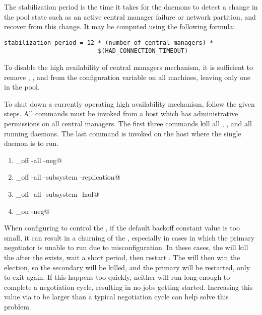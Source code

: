 The stabilization period is the time it takes for the
 daemons
to detect a change in the pool state such as
an active central manager failure
or network partition, and recover from this change.
It may be computed using the following formula:
\footnotesize
\begin{verbatim}
stabilization period = 12 * (number of central managers) *
                          $(HAD_CONNECTION_TIMEOUT)
\end{verbatim}
\normalsize


To disable the high availability of central managers mechanism,
it is sufficient to remove
, ,  and  from the
 configuration variable on all machines,
leaving only one  in the pool. 

To shut down a currently operating high availability mechanism,
follow the given steps.
All commands must be invoked
from a host which has administrative permissions
on all central managers.
The first three commands kill all ,
,
and all running  daemons.
The last command is invoked on the host where the
single  daemon is to run.

\begin{enumerate}
\item \verb@condor_off -all -neg@
\item \verb@condor_off -all -subsystem -replication@
\item \verb@condor_off -all -subsystem -had@
\item \verb@condor_on -neg@
\end{enumerate}

When configuring  to control the ,
if the default backoff constant value is too small, it can result in
a churning of the , especially in cases in which the
primary negotiator is unable to run due to misconfiguration.
In these cases, the  will kill the  after
the  exists, wait a short period, then restart
.  The  will then win the election, so
the secondary  will be killed, and the primary
will be restarted, only to exit again.  If this happens too quickly,
neither  will run long enough to complete a negotiation
cycle, resulting in no jobs getting started.  Increasing this value
via 
to be larger than a typical negotiation cycle can help solve this
problem.

